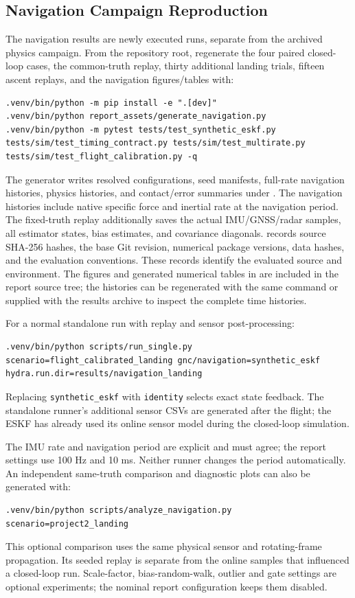 \subsection{Navigation Campaign Reproduction}\label{sec:nav-reproduction}

The navigation results are newly executed runs, separate from the archived physics
campaign. From the repository root, regenerate the four paired closed-loop cases, the common-truth
replay, thirty additional landing trials, fifteen ascent replays, and the navigation figures/tables with:
\begin{lstlisting}
.venv/bin/python -m pip install -e ".[dev]"
.venv/bin/python report_assets/generate_navigation.py
.venv/bin/python -m pytest tests/test_synthetic_eskf.py tests/sim/test_timing_contract.py tests/sim/test_multirate.py tests/sim/test_flight_calibration.py -q
\end{lstlisting}
The generator writes resolved configurations, seed manifests, full-rate navigation
histories, physics histories, and contact/error summaries under
. The navigation histories include native specific force and inertial rate at the navigation period.
The fixed-truth replay additionally saves the actual
IMU/GNSS/radar samples, all estimator states, bias estimates, and covariance diagonals.
 records source SHA-256 hashes, the base Git
revision, numerical package versions, data hashes, and the evaluation conventions. These records identify the evaluated source and environment.
The figures and generated numerical tables in  are
included in the report source tree; the  histories can be regenerated with the same command
or supplied with the results archive to inspect the complete time histories.

For a normal standalone run with replay and sensor post-processing:
\begin{lstlisting}
.venv/bin/python scripts/run_single.py scenario=flight_calibrated_landing gnc/navigation=synthetic_eskf hydra.run.dir=results/navigation_landing
\end{lstlisting}
Replacing \texttt{synthetic\_eskf} with \texttt{identity} selects exact state feedback.
The standalone runner's additional sensor CSVs are generated after the flight; the ESKF
has already used its online sensor model during the closed-loop simulation.

The IMU rate and navigation period are explicit and must agree; the report settings use
100 Hz and 10 ms. Neither runner changes the period automatically. An independent
same-truth comparison and diagnostic plots can also be generated with:
\begin{lstlisting}
.venv/bin/python scripts/analyze_navigation.py scenario=project2_landing
\end{lstlisting}
This optional comparison uses the same physical sensor and rotating-frame propagation.
Its seeded replay is separate from the online samples that influenced a closed-loop run.
Scale-factor, bias-random-walk, outlier and gate settings are optional experiments; the
nominal report configuration keeps them disabled.
